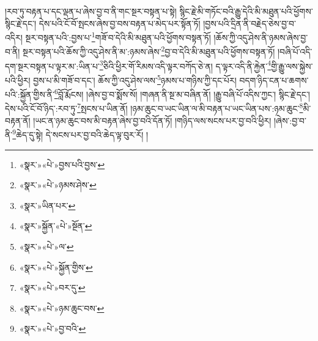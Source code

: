 །རབ་ཏུ་བརྟན་པ་དང་ལྡན་པ་ཞེས་བྱ་བ་ནི་གང་སྔར་བསྟན་པ་སྟེ། སྙིང་རྗེ་མི་གཏོང་བའི་རྒྱུ་དེའི་མི་མཐུན་པའི་ཕྱོགས་སྙིང་རྗེ་དང་། དེས་པའི་ངོ་བོ་སྤངས་ཞེས་བྱ་བས་བརྟན་པ་མེད་པར་སྟོན་ཏོ། །བྱས་པའི་དྲིན་ནི་བརྗེད་ཅེས་བྱ་བ་འདིར། སྔར་བསྟན་པའི་:བྱས་པ་\footnote{«སྣར་»«པེ་»བྱས་པའི་བྱས་}གཟོ་བ་དེའི་མི་མཐུན་པའི་ཕྱོགས་བསྟན་ཏོ། །ཆོས་ཀྱི་འདུ་ཤེས་ནི་ཉམས་ཞེས་བྱ་བ་ནི། སྔར་བསྟན་པའི་ཆོས་ཀྱི་འདུ་ཤེས་ནི་མ་:ཉམས་ཞེས་\footnote{«སྣར་»«པེ་»ཉམས་ཤེས་}བྱ་བ་དེའི་མི་མཐུན་པའི་ཕྱོགས་བསྟན་ཏོ། །བཞི་པོ་འདི་དག་སྔར་བསྟན་པ་ལྟར་མ་:ཡིན་པ་\footnote{«སྣར་»ཡིན་པར་}ཅིའི་ཕྱིར་གོ་རིམས་འདི་ལྟར་བཀོད་ཅེ་ན། ད་ལྟར་འདི་ནི་རྐྱེན་\footnote{«སྣར་»སྐྱོན་«པེ་»སྔོན་}གྱི་རྒྱུ་ལས་སྐྱེས་པའི་ཕྱིར། བྱས་པ་མི་གཟོ་བ་དང་། ཆོས་ཀྱི་འདུ་ཤེས་ལས་\footnote{«སྣར་»«པེ་»ལ་}ཉམས་པ་གཉིས་ཀྱི་དང་པོར། བདག་ཉིད་ངན་པ་ཆགས་པའི་:སྐྱོན་གྱིས་ནི་\footnote{«སྣར་»«པེ་»སྐྱོན་གྱིས་}བློ་རྨོངས། །ཞེས་བྱ་བ་སྨོས་སོ། །གཞན་ནི་སྔ་མ་བཞིན་ནོ། །རྒྱུ་བཞི་པོ་འདིས་ཀྱང་། སྙིང་རྗེ་དང་། དེས་པའི་ངོ་བོ་ཉིད་:རབ་ཏུ་\footnote{«སྣར་»«པེ་»བར་དུ་}སྤངས་པ་ཡིན་ནོ། །ཉམ་ཆུང་བ་ཡང་ཡིན་ལ་མི་བརྟན་པ་ཡང་ཡིན་པས་:ཉམ་ཆུང་\footnote{«སྣར་»«པེ་»ཉམ་ཆུང་བས་}མི་བརྟན་ནོ། །ཡང་ན་ཉམ་ཆུང་བས་མི་བརྟན་ཞེས་བྱ་བའི་དོན་ཏོ། །གཉིད་ལས་སངས་པར་བྱ་བའི་ཕྱིར། །ཞེས་:བྱ་བ་ནི་\footnote{«སྣར་»«པེ་»བྱ་བའི་}ཆེད་དུ་སྟེ། དེ་སངས་པར་བྱ་བའི་ཆེད་ལྟ་བུར་རོ། །

